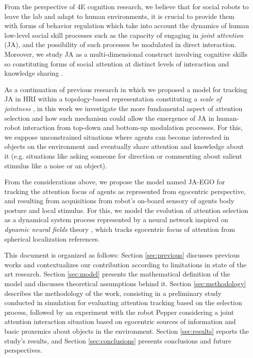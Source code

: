 \documentclass[letterpaper, 10 pt, conference]{ieeeconf}  %
\begin{document}
	From the perspective of 4E cognition research, we believe that for social robots to leave the lab and adapt to human environments, it is crucial to provide them with forms of behavior regulation which take into account the dynamics of human low-level social skill processes such as the capacity of engaging in \textit{joint attention} (JA), and the possibility of such processes be modulated in direct interaction. Moreover, we study JA as a multi-dimensional construct involving cognitive skills so constituting forms of social attention at distinct levels of interaction and knowledge sharing \cite{siposova2019}. 
	
	As a continuation of previous research in which we proposed a model for tracking JA in HRI within a topology-based representation constituting a \textit{scale of jointness} \cite{chame2023top}, in this work we investigate the more fundamental aspect of attention selection and how such mechanism could allow the emergence of JA in human-robot interaction from top-down and bottom-up modulation processes. For this, we suppose unconstrained situations where agents can become interested in objects on the environment and eventually share attention and knowledge about it (e.g. situations like asking someone for direction or commenting about salient stimulus like a noise or an object). 
	
	From the considerations above, we propose the model named JA-EGO for tracking the attention focus of agents as represented from egocentric perspective, and resulting from acquisitions from robot's on-board sensory of agents body posture and local stimulus. For this, we model the evolution of attention selection as a dynamical system process represented by a neural network inspired on \textit{dynamic neural fields} theory \cite{amari1977}, which tracks egocentric focus of attention from spherical localization references. 
	  
	  
	This document is organized as follows: Section \ref{sec:previous} discusses previous works and contextualizes our contribution according to limitations in state of the art research. Section \ref{sec:model} presents the mathematical definition of the model and discusses theoretical assumptions behind it. Section \ref{sec:methodology} describes the methodology of the work, consisting in a preliminary study conducted in simulation for evaluating attention tracking based on the selection process, followed by an experiment with the robot Pepper considering a joint attention interaction situation based on egocentric sources of information and basic proxemics about objects in the environment. Section \ref{sec:results} reports the study’s results, and Section \ref{sec:conclusions} presents conclusions and future perspectives.
	  
\end{document}
